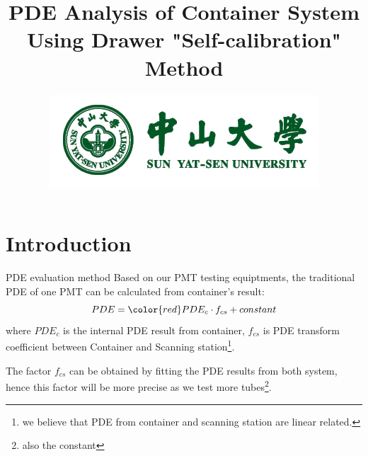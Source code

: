 \documentclass[11pt,compress,xcolor=x11names,UTF8]{beamer}
\title{PDE Analysis of Container System Using Drawer "Self-calibration" Method}
\author[Rong. Zhao]{Email：zhaor25@mail2.sysu.edu.cn \and  } %
\institute[Sun Yat-Sen University]{School of Physics\and } %
\date[\today]{\includegraphics[width=.5\textwidth]{logo}}
\begin{document}
\maketitle


\section{Introduction}


\begin{frame}{PDE evaluation method}
Based on our PMT testing equiptments, the traditional PDE of one PMT can be calculated from container's result:
\begin{equation}
PDE={\color{red}PDE_c}\cdot f_{cs}+constant
\end{equation}
where $PDE_c$ is the internal PDE result from container, $f_{cs}$ is PDE transform coefficient between Container and Scanning station\footnote{we believe that PDE from container and scanning station are linear related.}.
\vspace{.5cm}

The factor  $f_{cs}$ can be obtained by fitting the PDE results from both system, hence this factor will be more precise as we test more tubes\footnote{also the constant}. 
\end{frame}
\end{document}
